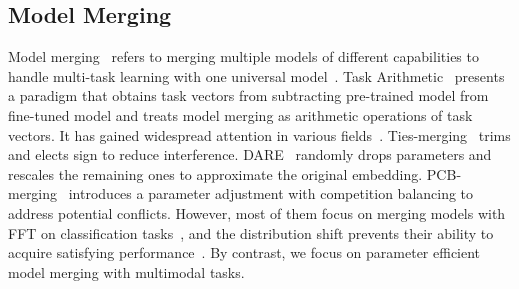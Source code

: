 \subsection{Model Merging}
Model merging~\cite{yang2024model,sung2023empirical} refers to merging multiple models of different capabilities to handle multi-task learning with one universal model~\cite{jin2023regmean,matena2022fisher}. Task Arithmetic~\cite{ilharco2023editing} presents a paradigm that obtains task vectors from subtracting pre-trained model from fine-tuned model and treats model merging as arithmetic operations of task vectors. It has gained widespread attention in various fields~\cite{tang2024wemoe}.
Ties-merging~\cite{yadav2024ties} trims and elects sign to reduce interference. DARE~\cite{yu2024dare} randomly drops parameters and rescales the remaining ones to approximate the original embedding. PCB-merging~\cite{guodong2024pcb} introduces a parameter adjustment with competition balancing to address potential conflicts. However, most of them focus on merging models with FFT on classification tasks~\cite{deng2009imagenet}, and the distribution shift prevents their ability to acquire satisfying performance~\cite{tang2024parameter}. By contrast, we focus on parameter efficient model merging with multimodal tasks.